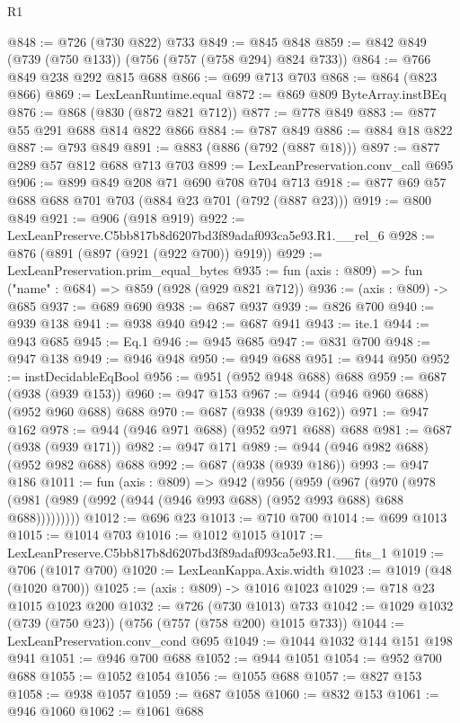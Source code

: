 \begin{lexlean}{R1}
\begin{coremodule}
@848 := @726 (@730 @822) @733
@849 := @845 @848
@859 := @842 @849 (@739 (@750 @133)) (@756 (@757 (@758 @294) @824 @733))
@864 := @766 @849 @238 @292 @815 @688
@866 := @699 @713 @703
@868 := @864 (@823 @866)
@869 := LexLeanRuntime.equal
@872 := @869 @809 ByteArray.instBEq
@876 := @868 (@830 (@872 @821 @712))
@877 := @778 @849
@883 := @877 @55 @291 @688 @814 @822 @866
@884 := @787 @849
@886 := @884 @18 @822
@887 := @793 @849
@891 := @883 (@886 (@792 (@887 @18)))
@897 := @877 @289 @57 @812 @688 @713 @703
@899 := LexLeanPreservation.conv_call @695
@906 := @899 @849 @208 @71 @690 @708 @704 @713
@918 := @877 @69 @57 @688 @688 @701 @703 (@884 @23 @701 (@792 (@887 @23)))
@919 := @800 @849
@921 := @906 (@918 @919)
@922 := LexLeanPreserve.C5bb817b8d6207bd3f89adaf093ca5e93.R1.__rel_6
@928 := @876 (@891 (@897 (@921 (@922 @700)) @919))
@929 := LexLeanPreservation.prim_equal_bytes
@935 := fun (axis : @809) => fun ("name" : @684) => @859 (@928 (@929 @821 @712))
@936 := (axis : @809) -> @685
@937 := @689 @690
@938 := @687 @937
@939 := @826 @700
@940 := @939 @138
@941 := @938 @940
@942 := @687 @941
@943 := ite.{1}
@944 := @943 @685
@945 := Eq.{1}
@946 := @945 @685
@947 := @831 @700
@948 := @947 @138
@949 := @946 @948
@950 := @949 @688
@951 := @944 @950
@952 := instDecidableEqBool
@956 := @951 (@952 @948 @688) @688
@959 := @687 (@938 (@939 @153))
@960 := @947 @153
@967 := @944 (@946 @960 @688) (@952 @960 @688) @688
@970 := @687 (@938 (@939 @162))
@971 := @947 @162
@978 := @944 (@946 @971 @688) (@952 @971 @688) @688
@981 := @687 (@938 (@939 @171))
@982 := @947 @171
@989 := @944 (@946 @982 @688) (@952 @982 @688) @688
@992 := @687 (@938 (@939 @186))
@993 := @947 @186
@1011 := fun (axis : @809) =>
  @942
    (@956
      (@959
        (@967
          (@970 (@978 (@981 (@989 (@992 (@944 (@946 @993 @688) (@952 @993 @688) @688 @688)))))))))
@1012 := @696 @23
@1013 := @710 @700
@1014 := @699 @1013
@1015 := @1014 @703
@1016 := @1012 @1015
@1017 := LexLeanPreserve.C5bb817b8d6207bd3f89adaf093ca5e93.R1.__fits_1
@1019 := @706 (@1017 @700)
@1020 := LexLeanKappa.Axis.width
@1023 := @1019 (@48 (@1020 @700))
@1025 := (axis : @809) -> @1016 @1023
@1029 := @718 @23 @1015 @1023 @200
@1032 := @726 (@730 @1013) @733
@1042 := @1029 @1032 (@739 (@750 @23)) (@756 (@757 (@758 @200) @1015 @733))
@1044 := LexLeanPreservation.conv_cond @695
@1049 := @1044 @1032 @144 @151 @198 @941
@1051 := @946 @700 @688
@1052 := @944 @1051
@1054 := @952 @700 @688
@1055 := @1052 @1054
@1056 := @1055 @688
@1057 := @827 @153
@1058 := @938 @1057
@1059 := @687 @1058
@1060 := @832 @153
@1061 := @946 @1060
@1062 := @1061 @688

\end{coremodule}
\end{lexlean}
